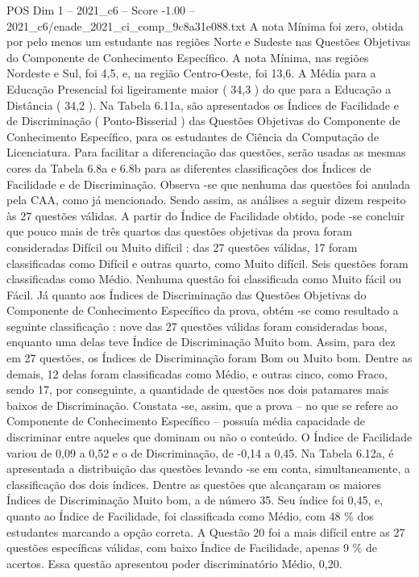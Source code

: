 \begin{textsample}{POS Dim 1 – 2021\_c6 – Score -1.00 – 2021\_c6/enade\_2021\_ci\_comp\_9c8a31e088.txt}
A nota Mínima foi zero, obtida por pelo menos um estudante nas regiões Norte e Sudeste nas Questões Objetivas do Componente de Conhecimento Específico.
A nota Mínima, nas regiões Nordeste e Sul, foi 4,5, e, na região Centro-Oeste, foi 13,6.
A Média para a Educação Presencial foi ligeiramente maior ( 34,3 ) do que para a Educação a Distância ( 34,2 ).
Na Tabela 6.11a, são apresentados os Índices de Facilidade e de Discriminação ( Ponto-Bisserial ) das Questões Objetivas do Componente de Conhecimento Específico, para os estudantes de Ciência da Computação de Licenciatura.
Para facilitar a diferenciação das questões, serão usadas as mesmas cores da Tabela 6.8a e 6.8b para as diferentes classificações dos Índices de Facilidade e de Discriminação.
Observa -se que nenhuma das questões foi anulada pela CAA, como já mencionado.
Sendo assim, as análises a seguir dizem respeito às 27 questões válidas.
A partir do Índice de Facilidade obtido, pode -se concluir que pouco mais de três quartos das questões objetivas da prova foram consideradas Difícil ou Muito difícil : das 27 questões válidas, 17 foram classificadas como Difícil e outras quarto, como Muito difícil.
Seis questões foram classificadas como Médio.
Nenhuma questão foi classificada como Muito fácil ou Fácil.
Já quanto aos Índices de Discriminação das Questões Objetivas do Componente de Conhecimento Específico da prova, obtém -se como resultado a seguinte classificação : nove das 27 questões válidas foram consideradas boas, enquanto uma delas teve Índice de Discriminação Muito bom.
Assim, para dez em 27 questões, os Índices de Discriminação foram Bom ou Muito bom.
Dentre as demais, 12 delas foram classificadas como Médio, e outras cinco, como Fraco, sendo 17, por conseguinte, a quantidade de questões nos dois patamares mais baixos de Discriminação.
Constata -se, assim, que a prova – no que se refere ao Componente de Conhecimento Específico – possuía média capacidade de discriminar entre aqueles que dominam ou não o conteúdo.
O Índice de Facilidade variou de 0,09 a 0,52 e o de Discriminação, de -0,14 a 0,45.
Na Tabela 6.12a, é apresentada a distribuição das questões levando -se em conta, simultaneamente, a classificação dos dois índices.
Dentre as questões que alcançaram os maiores Índices de Discriminação Muito bom, a de número 35.
Seu índice foi 0,45, e, quanto ao Índice de Facilidade, foi classificada como Médio, com 48 \% dos estudantes marcando a opção correta.
A Questão 20 foi a mais difícil entre as 27 questões específicas válidas, com baixo Índice de Facilidade, apenas 9 \% de acertos.
Essa questão apresentou poder discriminatório Médio, 0,20.

\end{textsample}
